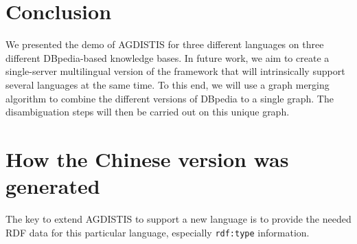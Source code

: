 \section{Conclusion}
We presented the demo of AGDISTIS for three different languages on three different DBpedia-based knowledge bases.
In future work, we aim to create a single-server multilingual version of the framework that will intrinsically support several languages at the same time.
To this end, we will use a graph merging algorithm to combine the different versions of DBpedia to a single graph.
The disambiguation steps will then be carried out on this unique graph.









\section{How the Chinese version was generated}
\label{sec:chinese}

The key to extend AGDISTIS to support a new language is to provide the needed RDF data for this particular language, especially \texttt{rdf:type} information. 


